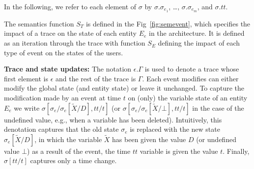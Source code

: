 \documentclass[a4paper]{article}
\begin{document}
In the following, we refer to each element of $\sigma$ by $\sigma$.$\sigma_{e_1}$, \dots, $\sigma$.$\sigma_{e_m}$, and $\sigma$.$tt$. 


The semantics function $S_T$ is defined in the Fig~\ref{fig:semevent}, which specifies the impact of a trace on the state of each entity $E_e$ in the architecture. It is defined as an iteration through the trace with function $S_E$ defining the impact of each type of event on the states of the users. 

\textbf{Trace and state updates:} The notation $\epsilon.\Gamma$ is used to denote a trace whose first element is $\epsilon$ and the rest of the trace is $\Gamma$. Each event modifies can either modify the global state (and entity state) or leave it unchanged. To capture the modification made by an event at time $t$ on (only) the variable state of an entity $E_e$ we write $\sigma [\sigma_e / \sigma_e[\tilde{X}/D], tt / t]$ (or $\sigma [\sigma_e / \sigma_e[\tilde{X}/\bot], tt / t]$ in the case of the undefined value, e.g., when a variable has been deleted). Intuitively, this denotation captures that the old state $\sigma_e$ is replaced with the new state $\sigma_e[\tilde{X}/D]$, in which the variable $\tilde{X}$ has been given the value $D$ (or undefined value $\bot$) as a result of the event, the time $tt$  variable is given the value $t$. Finally, $\sigma[tt / t]$ captures only a time change. 
\end{document}
